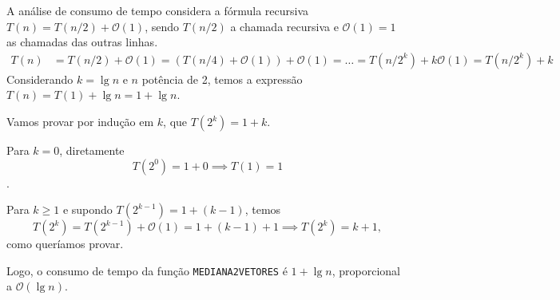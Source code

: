 \documentclass{article}
\newcommand{\bigO}[1]{\ensuremath{\mathcal{O}(#1)}}
\begin{document}
\bigskip

A análise de consumo de tempo considera a fórmula recursiva $T(n) = T(n/2) + \bigO{1}$, sendo $T(n/2)$ a chamada recursiva e $\bigO{1} = 1$ as chamadas das outras linhas.
\begin{align*}
  T(n) &= T(n/2) + \bigO{1} = (T(n/4) + \bigO{1}) + \bigO{1} = \dots = T(n/2^k) + k\bigO{1} = T(n/2^k) + k
\end{align*}
Considerando $k = \lg n$ e $n$ potência de 2, temos a expressão $T(n) = T(1) + \lg n = 1 + \lg n$.

Vamos provar por indução em $k$, que $T(2^k) = 1 + k$.

Para $k = 0$, diretamente $$T(2^0) = 1 + 0 \implies T(1) = 1$$.

Para $k \geq 1$ e supondo $T(2^{k-1}) = 1 + (k-1)$, temos
$$
  T(2^k) = T(2^{k-1}) + \bigO{1} = 1 + (k-1) + 1 \implies T(2^k) = k + 1,
$$
como queríamos provar.

Logo, o consumo de tempo da função \texttt{MEDIANA2VETORES} é $1 + \lg n$, proporcional a \bigO{\lg n}.
\end{document}
